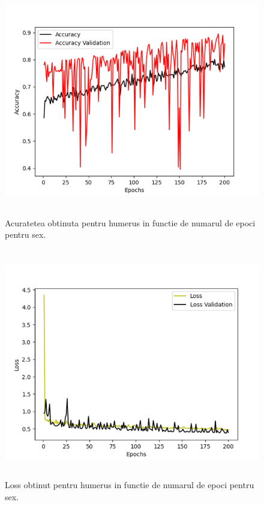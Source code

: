 \documentclass[runningheads,a4paper,11pt]{report}
\begin{document}
\begin{figure}[h!]
\centerline{\includegraphics[height=10cm]{Imagini/acuratete_humerus.png}}
\caption{Acuratetea obtinuta pentru humerus in functie de numarul de epoci pentru sex.}
\label{fig}
\end{figure}

\begin{figure}[h!]
\centerline{\includegraphics[height=10cm]{Imagini/loss_humerus.png}}
\caption{Loss obtinut pentru humerus in functie de numarul de epoci pentru sex.}
\label{fig}
\end{figure}
\end{document}
